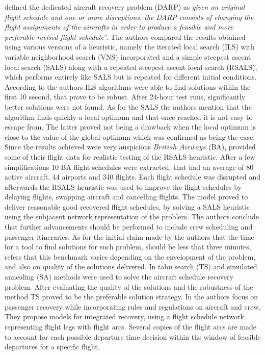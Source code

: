 \documentclass[ijoo,nonblindrev]{informs-ijoo}
\begin{document}
\citep{Love2001} defined the dedicated aircraft recovery problem (DARP) as \textit{given an original flight schedule and one or more disruptions, the DARP consists of changing  the flight assignments of the aircrafts in order to produce a feasible and more preferable revised flight schedule}”. The authors compared the results obtained using various versions of a heuristic, namely the iterated local search (ILS) with variable neighborhood search (VNS) incorporated and a simple steepest ascent local search (SALS) along with a repeated steepest ascent local search (RSALS), which performs entirely like SALS but is repeated for different initial conditions. According to the authors ILS algorithms were able to find solutions within the first 10 second, that prove to be robust. After 24-hour test runs, significantly better solutions were not found. As for the SALS the authors mention that the algorithm finds quickly a local optimum and that once reached it is not easy to escape from. The latter proved not being a drawback when the local optimum is close to the value of the global optimum which was confirmed as being the case. Since the results achieved were very auspicious $British$ $Airways$ (BA), provided some of their flight data for realistic testing of the RSALS heuristic. After a few simplifications 10 BA flight schedules were extracted, that had an average of 80 active aircraft, 44 airports and 340 flights. Each flight schedule was disrupted and afterwards the RSALS heuristic was used to improve the flight schedules by delaying flights, swapping aircraft and cancelling flights.  The model proved to deliver reasonable good recovered flight schedules, by solving a SALS heuristic using the subjacent network representation of the problem. The authors conclude that further advancements should be performed to include crew scheduling and passenger itineraries.   As for the initial claim made by the authors that the time for a tool to find solutions for such problem, should be less that three minutes, \citep{Andersson:2006} refers that this benchmark varies depending on the envelopment of the problem, and also on quality of the solutions delivered.
In \citep{Andersson:2006} tabu search (TS) and simulated annealing (SA) methods were used to solve the aircraft schedule recovery problem. After evaluating the quality of the solutions and the robustness of the method TS proved to be the preferable solution strategy.
In \citep{Bratu2006} the authors focus on passenger recovery while incorporating rules and regulations on aircraft and crew. They propose models for integrated recovery, using a flight schedule network representing flight legs with flight arcs. Several copies of the flight arcs are made to account for each possible departure time decision within the window of feasible departures for a specific flight.\\
\end{document}

